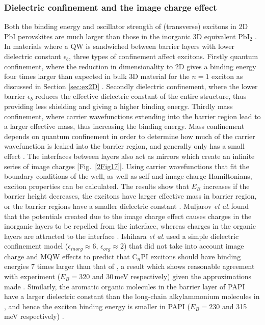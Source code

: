 \subsubsection{Dielectric confinement and the image charge effect}
\label{sec:confinement}
Both the binding energy and oscillator strength of (transverse) excitons in 2D PbI perovskites are much larger than those in the inorganic 3D equivalent Pb$\textrm{I}_2$ \cite{Hirasawa1994}. In materials where a QW is sandwiched between barrier layers with lower dielectric constant $\epsilon_b$, three types of confinement affect excitons. Firstly quantum confinement, where the reduction in dimensionality to 2D gives a binding energy four times larger than expected in bulk 3D material for the $n=1$ exciton as discussed in Section \ref{sec:ex2D} \cite{Shinada1966}. Secondly dielectric confinement, where the lower barrier $\epsilon_b$ reduces the effective dielectric constant of the entire structure, thus providing less shielding and giving a higher binding energy. Thirdly mass confinement, where carrier wavefunctions extending into the barrier region lead to a larger effective mass, thus increasing the binding energy. Mass confinement depends on quantum confinement in order to determine how much of the carrier wavefunction is leaked into the barrier region, and generally only has a small effect \cite{Kumagai1989}. The interfaces between layers also act as mirrors which create an infinite series of image charges [Fig.\ \ref{2Fig17}]. Using carrier wavefunctions that fit the boundary conditions of the well, as well as self and image-charge Hamiltonians, exciton properties can be calculated. The results show that $E_B$ increases if the barrier height decreases, the excitons have larger effective mass in barrier region, or the barrier regions have a smaller dielectric constant \cite{Kumagai1989}. Muljarov \textit{et al.\,}found that the potentials created due to the image charge effect causes charges in the inorganic layers to be repelled from the interface, whereas charges in the organic layers are attracted to the interface \cite{Muljarov1995}. Ishihara \textit{et al.\,}used a simple dielectric confinement model %
($\epsilon_{inorg}\approx 6$, $\epsilon_{org} \approx 2$) %
that did not take into account image charge and MQW effects to predict that C$_n$PI excitons should have binding energies 7 times larger than that of , a result which shows reasonable agreement with experiment ($E_B=320$ and 30\,meV respectively) given the approximations made \cite{Ishihara1990}. Similarly, the aromatic organic molecules in the barrier layer of PAPI have a larger dielectric constant than the long-chain alkylammonium molecules in , and hence the exciton binding energy is smaller in PAPI ($E_B=230$ and 315\,meV respectively) \cite{Hong1992a}.

